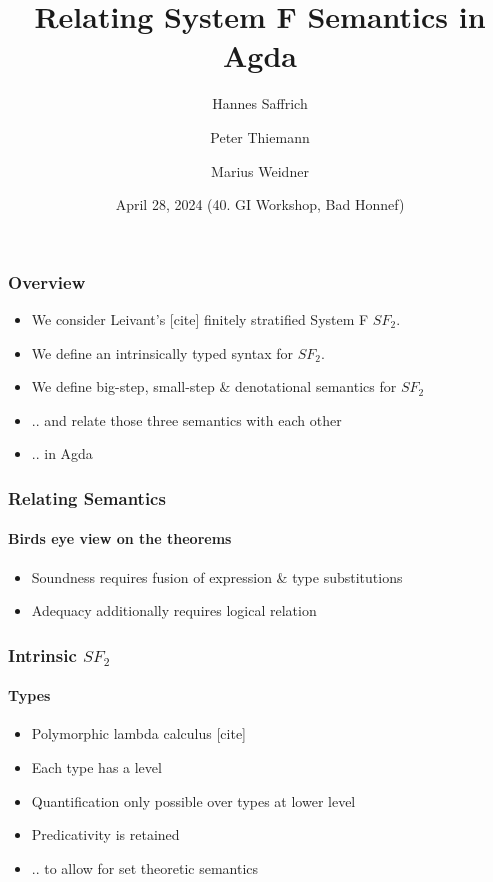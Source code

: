\documentclass[dvipsnames,aspectratio=169,pdftex]{beamer}
\title{Relating System F Semantics in Agda}
\author[Saffrich, Thiemann, Weidner] {
  Hannes Saffrich \and 
  Peter Thiemann \and
  Marius Weidner
}
\institute{University of Freiburg}
\date{April 28, 2024 (40. GI Workshop, Bad Honnef)}
\begin{document}
\begin{frame}{\null}
  \titlepage 
\end{frame}

\begin{frame}[fragile]
  \frametitle{Overview}
  \begin{itemize}
    \item We consider Leivant's [cite] finitely stratified System F $SF_2$.
    \item We define an intrinsically typed syntax for $SF_2$.
    \item We define big-step, small-step \& denotational semantics for $SF_2$
    \item .. and relate those three semantics with each other
    \item .. in Agda
  \end{itemize}
\end{frame}

\begin{frame}[fragile]
  \frametitle{Relating Semantics}
  \framesubtitle{Birds eye view on the theorems}
  \vspace{5mm}
  \begin{itemize} 
    \item Soundness requires fusion of expression \& type substitutions
    \item Adequacy additionally requires logical relation
  \end{itemize}
\end{frame}

\begin{frame}
  \frametitle{Intrinsic $SF_2$}
  \framesubtitle{Types}
  \TFType
  \begin{itemize}
    \item Polymorphic lambda calculus [cite]
    \item Each type has a level
    \item Quantification only possible over types at lower level
    \item Predicativity is retained
    \item .. to allow for set theoretic semantics
  \end{itemize}
\end{frame}
\end{document}
